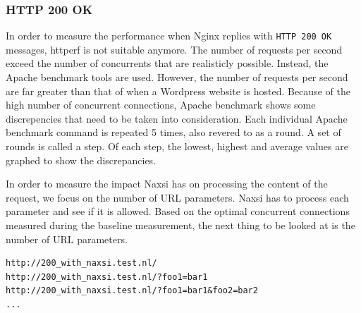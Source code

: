 \documentclass[Methods]{subfiles}
\begin{document}
\subsubsection{HTTP 200 OK}
In order to measure the performance when Nginx replies with \verb+HTTP 200 OK+ messages, httperf is not suitable anymore. The number of requests per second exceed the number of concurrents that are realisticly possible. Instead, the Apache benchmark tools are used. However, the number of requests per second are far greater than that of when a Wordpress website is hosted. Because of the high number of concurrent connections, Apache benchmark shows some discrepencies that need to be taken into consideration. Each individual Apache benchmark command is repeated 5 times, also revered to as a round. A set of rounds is called a step. Of each step, the lowest, highest and average values are graphed to show the discrepancies.

In order to measure the impact Naxsi has on processing the content of the request, we focus on the number of URL parameters. Naxsi has to process each parameter and see if it is allowed. Based on the optimal concurrent connections measured during the baseline measurement, the next thing to be looked at is the number of URL parameters.

\begin{verbatim}
http://200_with_naxsi.test.nl/
http://200_with_naxsi.test.nl/?foo1=bar1
http://200_with_naxsi.test.nl/?foo1=bar1&foo2=bar2
...
\end{verbatim}
\end{document}
